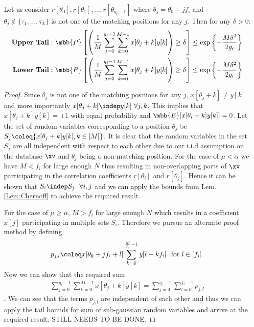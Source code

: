 \begin{lemma}
	\label{Lem:tailbounds}
Let us consider $r[\theta_0],r[\theta_1],\ldots ,r[\theta_{g_i-1}]$ where $\theta_j=\theta_0+jf_i$ and $\theta_j \notin \{\tau_1,\ldots, \tau_L\}$ is not one of the matching positions for any $j$. Then for any $\delta>0$:
\begin{align*}
\text{\textbf{Upper Tail}}: ~&\mbb{P}\left[ \left(\frac{1}{M}\sum\limits_{j=0}^{g_i-1}\sum\limits_{k=0}^{M-1}x[\theta_j+k]y[k]\right)\geq \delta\right]\leq \exp\left\lbrace-\frac{M\delta^2}{2g_i}\right\rbrace\\
\text{\textbf{Lower Tail}}: ~&\mbb{P}\left[ \left(\frac{1}{M}\sum\limits_{j=0}^{g_i-1}\sum\limits_{k=0}^{M-1}x[\theta_j+k]y[k]\right)\geq \delta\right]\leq \exp\left\lbrace-\frac{M\delta^2}{2g_i}\right\rbrace\\
\end{align*}
\end{lemma}
\begin{proof}
Since $\theta_j$ is not one of the matching positions for any $j$, $x[\theta_j+k]\neq y[k]$ and more importantly $x[\theta_j+k]\indep y[k] ~\forall j,k$. This implies that $x[\theta_j+k]y[k]=\pm 1$ with equal probability and $\mbb{E}[x[\theta_i+k]y[k]]=0$. Let the set of random variables corresponding to a position $\theta_j$ be $S_{j}\coleq \{x[\theta_j+k]y[k],k\in[M]\}$. It is clear that the random variables in the set $S_j$ are all independent with respect to each other due to our i.i.d assumption on the database $\xv$ and $\theta_j$ being a non-matching position. For the case of $\mu<\alpha$ we have $M<f_i$ for large enough $N$ thus resulting in non-overlapping parts of $\xv$  participating in the correlation coefficients $r[\theta_i]$ and $r[\theta_j]$. Hence it can be shown that $S_i\indep S_j~~\forall i,j$ and we can apply the bounds from Lem. \ref{Lem:Chernoff} to achieve the required result.

For the case of $\mu\geq\alpha$, $M>f_i$ for large enough $N$ which results in a coefficient $x[j]$ participating in multiple sets $S_i$. Therefore we pursue an alternate proof method by defining 
$$
p_{j,l}\coleq x[\theta_0+jf_i+l]\sum_{k=0}^{\frac{M}{f_i} -1} y[l+kf_i] ~\text{ for } l\in[f_i].
$$ Now we can show that the required sum
\begin{align*}
\sum\limits_{j=0}^{g_i-1}\sum\limits_{k=0}^{M-1}x[\theta_j+k]y[k]=\sum_{j=0}^{g_i-1}\sum_{l=0}^{f_i -1}p_{j,l}
\end{align*}. We can see that the terms $p_{j,l}$ are independent of each other and thus we can apply the tail bounds for sum of sub-gaussian random variables and arrive at the required result.
STILL NEEDS TO BE DONE.
\end{proof}


